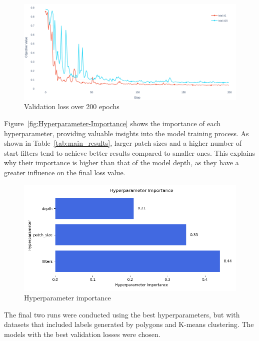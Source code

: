 \begin{figure}[H]
    \centering
    \includegraphics[width=0.75\linewidth]{PICTURES/loss.png}
    \caption{Validation loss over 200 epochs}
    \label{fig:validation_loss}
\end{figure}


Figure~\ref{fig:Hyperparameter-Importance} shows the importance of each hyperparameter, providing valuable insights into the model training process. As shown in Table~\ref{tab:main_results}, larger patch sizes and a higher number of start filters tend to achieve better results compared to smaller ones. This explains why their importance is higher than that of the model depth, as they have a greater influence on the final loss value.
\begin{figure}[H]
    \centering
    \includegraphics[width=0.75\linewidth]{PICTURES/hyperparam.png}
    \caption{Hyperparameter importance}
    \label{fig:}
\end{figure}

The final two runs were conducted using the best hyperparameters, but with datasets that included labels generated by polygons and K-means clustering. The models with the best validation losses were chosen. 
    
%

